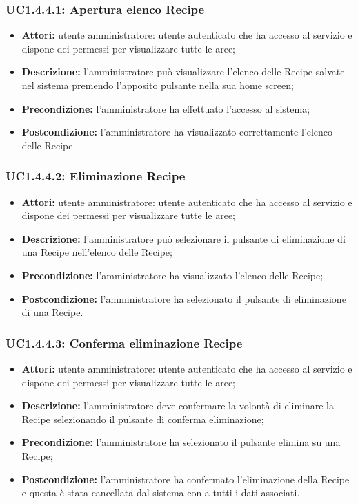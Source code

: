 \subsubsection{UC1.4.4.1: Apertura elenco Recipe}

\begin{itemize}
  	\item \textbf{Attori:} utente amministratore: utente autenticato che ha accesso al servizio e dispone dei permessi per visualizzare tutte le aree;
    \item \textbf{Descrizione:} l'amministratore può visualizzare l'elenco delle Recipe\gloss{} salvate nel sistema premendo l'apposito pulsante nella sua home screen;
    \item \textbf{Precondizione:} l'amministratore ha effettuato l'accesso al sistema;
    \item \textbf{Postcondizione:} l'amministratore ha visualizzato correttamente l'elenco delle Recipe\gloss{}.
\end{itemize}

\subsubsection{UC1.4.4.2: Eliminazione Recipe}

\begin{itemize}
  	\item \textbf{Attori:} utente amministratore: utente autenticato che ha accesso al servizio e dispone dei permessi per visualizzare tutte le aree;
    \item \textbf{Descrizione:} l'amministratore può selezionare il pulsante di eliminazione di una Recipe\gloss{} nell'elenco delle Recipe;
    \item \textbf{Precondizione:} l'amministratore ha visualizzato l'elenco delle Recipe\gloss{};
    \item \textbf{Postcondizione:} l'amministratore ha selezionato il pulsante di eliminazione di una Recipe\gloss{}.
\end{itemize}
\subsubsection{UC1.4.4.3: Conferma eliminazione Recipe}

\begin{itemize}
  	\item \textbf{Attori:} utente amministratore: utente autenticato che ha accesso al servizio e dispone dei permessi per visualizzare tutte le aree;
    \item \textbf{Descrizione:} l'amministratore deve confermare la volontà di eliminare la Recipe\gloss{} selezionando il pulsante di conferma eliminazione;
    \item \textbf{Precondizione:} l'amministratore ha selezionato il pulsante elimina su una Recipe\gloss{};
    \item \textbf{Postcondizione:} l'amministratore ha confermato l'eliminazione della Recipe\gloss{} e questa è stata cancellata dal sistema con a tutti i dati associati.
\end{itemize}

